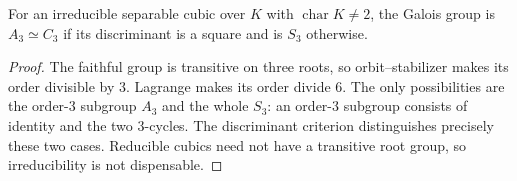 \begin{corollary}
For an irreducible separable cubic over $K$ with $\operatorname{char}K\ne2$, the Galois group is $A_3\simeq C_3$ if its discriminant is a square and is $S_3$ otherwise.
\end{corollary}
\begin{proof}
The faithful group is transitive on three roots, so orbit--stabilizer makes its order divisible by $3$. Lagrange makes its order divide $6$. The only possibilities are the order-$3$ subgroup $A_3$ and the whole $S_3$: an order-$3$ subgroup consists of identity and the two $3$-cycles. The discriminant criterion distinguishes precisely these two cases. Reducible cubics need not have a transitive root group, so irreducibility is not dispensable.
\end{proof}

